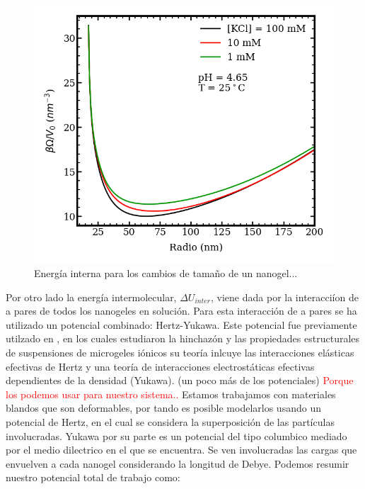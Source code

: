 \begin{figure}[!tb]
	\centering
	\includegraphics[width=1\linewidth]{Figures/graph-mc/interna.png}
	\caption{Energ\'ia interna para los cambios de tamaño de un nanogel...}
	\label{fig:mc:omega}
\end{figure}


Por otro lado la energ\'ia intermolecular, $\Delta U_{inter}$, viene dada por la interacci\'ion de a pares de todos los nanogeles en soluci\'on. 
Para esta interacci\'on de a pares se ha utilizado un potencial combinado: Hertz-Yukawa. Este potencial fue previamente utilzado en , en los cuales  
estudiaron la hinchaz\'on y las propiedades estructurales de suspensiones de microgeles i\'onicos su teor\'ia inlcuye las interacciones el\'asticas efectivas de Hertz y una teor\'ia de interacciones electrost\'aticas efectivas dependientes de la densidad (Yukawa). 
(un poco m\'as de los potenciales)
\textcolor{red}{Porque los podemos usar para nuestro sistema..}
Estamos trabajamos con materiales blandos que son deformables, por tando es posible modelarlos usando un potencial de Hertz, en el cual se considera la superposici\'on de las part\'iculas involucradas.
Yukawa por su parte es un potencial del tipo columbico mediado por el medio dilectrico en el que se encuentra. Se ven involucradas las cargas que envuelven a cada nanogel considerando la longitud de Debye. 
Podemos resumir nuestro potencial total de trabajo como:

